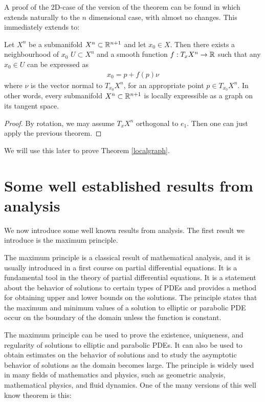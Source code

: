 A proof of the 2D-case of the version of the theorem can be found in \cite{DoCarmo} which extends naturally to the $n$ dimensional case, with almost no changes. This immediately extends to:

\begin{cor}
	Let $X^n$ be a submanifold $X^n\subset\mathbb{R}^{n+1}$ and let $x_0\in X$. Then there exists a neighbourhood of $x_0$ $U\subset X^n$ and a smooth function $f: T_x X^n\rightarrow \mathbb{R}$ such that any $x_0\in U$ can be expressed as \label{localgraphcorollary}
	\begin{align*}
		x_0= p + f(p) \nu 
	\end{align*}
	where $\nu$ is the vector normal to $T_{x_0} X^n$, for an appropriate point $p\in T_{x_0} X^n$. 
	In other words, every submanifold $X^n\subset\mathbb{R}^{n+1}$ is locally expressible as a graph on its tangent space. 
\end{cor}

\begin{proof}
	By rotation, we may assume $T_x X^n$ orthogonal to $e_1$. Then one can just apply the previous theorem. 
\end{proof}

We will use this later to prove Theorem \ref{localgraph}. 


\section{Some well established results from analysis}

We now introduce some well known results from analysis. The first result we introduce is the maximum principle.

The maximum principle is a classical result of mathematical analysis, and it is usually introduced in a first course on partial differential equations. It is a fundamental tool in the theory of partial differential equations. It is a statement about the behavior of solutions to certain types of PDEs and provides a method for obtaining upper and lower bounds on the solutions. The principle states that the maximum and minimum values of a solution to elliptic or parabolic PDE occur on the boundary of the domain unless the function is constant. 

The maximum principle can be used to prove the existence, uniqueness, and regularity of solutions to elliptic and parabolic PDEs. It can also be used to obtain estimates on the behavior of solutions and to study the asymptotic behavior of solutions as the domain becomes large. The principle is widely used in many fields of mathematics and physics, such as geometric analysis, mathematical physics, and fluid dynamics. One of the many versions of this well know theorem is this: 

